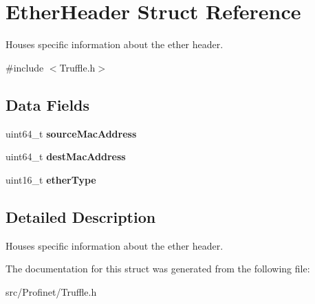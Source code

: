 \hypertarget{struct_ether_header}{}\section{Ether\+Header Struct Reference}
\label{struct_ether_header}


Houses specific information about the ether header.  




{\ttfamily \#include $<$Truffle.\+h$>$}

\subsection*{Data Fields}
\begin{DoxyCompactItemize}
\item 
\hypertarget{struct_ether_header_ab4999641b26b615e3eea9394a116ed62}{}uint64\+\_\+t {\bfseries source\+Mac\+Address}\label{struct_ether_header_ab4999641b26b615e3eea9394a116ed62}

\item 
\hypertarget{struct_ether_header_ac71ed57be2c8e9841e36a41875893e78}{}uint64\+\_\+t {\bfseries dest\+Mac\+Address}\label{struct_ether_header_ac71ed57be2c8e9841e36a41875893e78}

\item 
\hypertarget{struct_ether_header_a6a0916fd23f851ba6cd2bcd3700123b2}{}uint16\+\_\+t {\bfseries ether\+Type}\label{struct_ether_header_a6a0916fd23f851ba6cd2bcd3700123b2}

\end{DoxyCompactItemize}


\subsection{Detailed Description}
Houses specific information about the ether header. 

The documentation for this struct was generated from the following file\+:\begin{DoxyCompactItemize}
\item 
src/\+Profinet/Truffle.\+h\end{DoxyCompactItemize}
